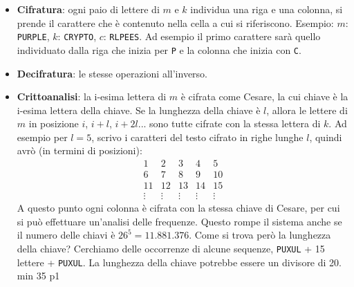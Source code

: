 \begin{itemize}
	\item \textbf{Cifratura}: ogni paio di lettere di $m$ e $k$ individua una riga e una colonna, si prende il carattere che è contenuto nella cella a cui si riferiscono.
	Esempio: $m$: \texttt{PURPLE}, $k$: \texttt{CRYPTO}, $c$: \texttt{RLPEES}.
	Ad esempio il primo carattere sarà quello individuato dalla riga che inizia per \texttt{P} e la colonna che inizia con \texttt{C}.
	\item \textbf{Decifratura}: le stesse operazioni all'inverso.
	\item \textbf{Crittoanalisi}: la i-esima lettera di $m$ è cifrata come Cesare, la cui chiave è la i-esima lettera della chiave. Se la lunghezza della chiave è $l$, allora le lettere di $m$ in posizione $i$, $i+l$, $i+2l$... sono tutte cifrate con la stessa lettera di $k$.
	Ad esempio per $l = 5$, scrivo i caratteri del testo cifrato in righe lunghe $l$, quindi avrò (in termini di posizioni):
	\begin{equation*}
	\begin{matrix}
	1 & 2 & 3 & 4 & 5\\
	6 & 7 & 8 & 9 & 10\\
	11 & 12 & 13 & 14 & 15\\
	\vdots & \vdots & \vdots & \vdots & \vdots
	\end{matrix}
	\end{equation*}
	A questo punto ogni colonna è cifrata con la stessa chiave di Cesare, per cui si può effettuare un'analisi delle frequenze.
	Questo rompe il sistema anche se il numero delle chiavi è $26^5 = 11.881.376$.
	Come si trova però la lunghezza della chiave? Cerchiamo delle occorrenze di alcune sequenze, \texttt{PUXUL} + 15 lettere + \texttt{PUXUL}. La lunghezza della chiave potrebbe essere un divisore di 20.
	min 35 p1
\end{itemize}



